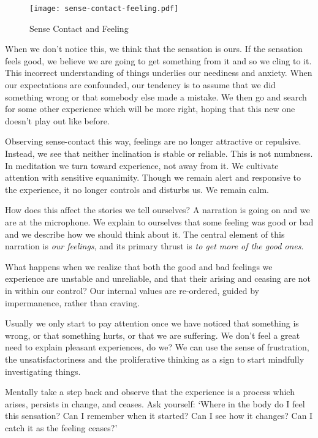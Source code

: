 \clearpage

\begin{figure}[h]
\caption{Sense Contact and Feeling}\label{fig-sense-contact-feeling}
\bigskip\centering
\texttt{[image: sense-contact-feeling.pdf]}
\end{figure}

\clearpage

When we don't notice this, we think that the sensation is ours. If the
sensation feels good, we believe we are going to get something from it
and so we cling to it. This incorrect understanding of things underlies
our neediness and anxiety. When our expectations are confounded, our
tendency is to assume that we did something wrong or that somebody else
made a mistake. We then go and search for some other experience which
will be more right, hoping that this new one doesn't play out like
before.

Observing sense-contact this way, feelings are no longer attractive or
repulsive. Instead, we see that neither inclination is stable or
reliable. This is not numbness. In meditation we turn toward experience,
not away from it. We cultivate attention with sensitive equanimity.
Though we remain alert and responsive to the experience, it no longer
controls and disturbs us. We remain calm.


How does this affect the stories we tell ourselves? A narration is going
on and we are at the microphone. We explain to ourselves that some
feeling was good or bad and we describe how we should think about it.
The central element of this narration is \emph{our feelings}, and its
primary thrust is \emph{to get more of the good ones}.

What happens when we realize that both the good and bad feelings we
experience are unstable and unreliable, and that their arising and
ceasing are not in within our control? Our internal values are
re-ordered, guided by impermanence, rather than craving.


Usually we only start to pay attention once we have noticed that
something is wrong, or that something hurts, or that we are suffering.
We don't feel a great need to explain pleasant experiences, do we? We
can use the sense of frustration, the unsatisfactoriness and the
proliferative thinking as a sign to start mindfully investigating
things.

Mentally take a step back and observe that the experience is a process
which arises, persists in change, and ceases. Ask yourself: `Where in
the body do I feel this sensation? Can I remember when it started? Can I
see how it changes? Can I catch it as the feeling ceases?'


